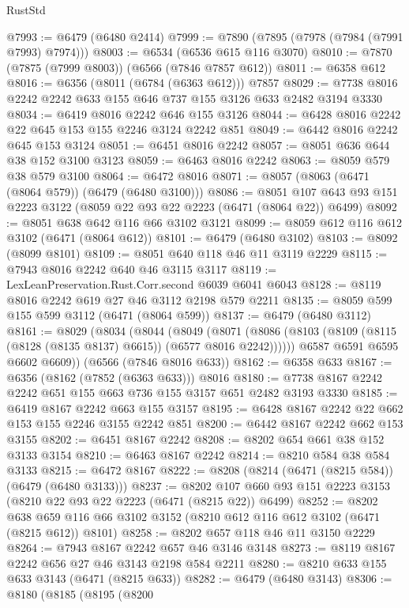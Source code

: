 \begin{lexlean}{RustStd}
\begin{coremodule}
@7993 := @6479 (@6480 @2414)
@7999 := @7890 (@7895 (@7978 (@7984 (@7991 @7993) @7974)))
@8003 := @6534 (@6536 @615 @116 @3070)
@8010 := @7870 (@7875 (@7999 @8003)) (@6566 (@7846 @7857 @612))
@8011 := @6358 @612
@8016 := @6356 (@8011 (@6784 (@6363 @612))) @7857
@8029 := @7738 @8016 @2242 @2242 @633 @155 @646 @737 @155 @3126 @633 @2482 @3194 @3330
@8034 := @6419 @8016 @2242 @646 @155 @3126
@8044 := @6428 @8016 @2242 @22 @645 @153 @155 @2246 @3124 @2242 @851
@8049 := @6442 @8016 @2242 @645 @153 @3124
@8051 := @6451 @8016 @2242
@8057 := @8051 @636 @644 @38 @152 @3100 @3123
@8059 := @6463 @8016 @2242
@8063 := @8059 @579 @38 @579 @3100
@8064 := @6472 @8016
@8071 := @8057 (@8063 (@6471 (@8064 @579)) (@6479 (@6480 @3100)))
@8086 := @8051 @107 @643 @93 @151 @2223 @3122 (@8059 @22 @93 @22 @2223 (@6471 (@8064 @22)) @6499)
@8092 := @8051 @638 @642 @116 @66 @3102 @3121
@8099 := @8059 @612 @116 @612 @3102 (@6471 (@8064 @612))
@8101 := @6479 (@6480 @3102)
@8103 := @8092 (@8099 @8101)
@8109 := @8051 @640 @118 @46 @11 @3119 @2229
@8115 := @7943 @8016 @2242 @640 @46 @3115 @3117
@8119 := LexLeanPreservation.Rust.Corr.second @6039 @6041 @6043
@8128 := @8119 @8016 @2242 @619 @27 @46 @3112 @2198 @579 @2211
@8135 := @8059 @599 @155 @599 @3112 (@6471 (@8064 @599))
@8137 := @6479 (@6480 @3112)
@8161 := @8029
    (@8034
      (@8044
        (@8049
          (@8071 (@8086 (@8103 (@8109 (@8115 (@8128 (@8135 @8137) @6615)) (@6577 @8016 @2242))))))
        @6587
        @6591
        @6595
        @6602
        @6609))
    (@6566 (@7846 @8016 @633))
@8162 := @6358 @633
@8167 := @6356 (@8162 (@7852 (@6363 @633))) @8016
@8180 := @7738 @8167 @2242 @2242 @651 @155 @663 @736 @155 @3157 @651 @2482 @3193 @3330
@8185 := @6419 @8167 @2242 @663 @155 @3157
@8195 := @6428 @8167 @2242 @22 @662 @153 @155 @2246 @3155 @2242 @851
@8200 := @6442 @8167 @2242 @662 @153 @3155
@8202 := @6451 @8167 @2242
@8208 := @8202 @654 @661 @38 @152 @3133 @3154
@8210 := @6463 @8167 @2242
@8214 := @8210 @584 @38 @584 @3133
@8215 := @6472 @8167
@8222 := @8208 (@8214 (@6471 (@8215 @584)) (@6479 (@6480 @3133)))
@8237 := @8202 @107 @660 @93 @151 @2223 @3153 (@8210 @22 @93 @22 @2223 (@6471 (@8215 @22)) @6499)
@8252 := @8202
    @638
    @659
    @116
    @66
    @3102
    @3152
    (@8210 @612 @116 @612 @3102 (@6471 (@8215 @612)) @8101)
@8258 := @8202 @657 @118 @46 @11 @3150 @2229
@8264 := @7943 @8167 @2242 @657 @46 @3146 @3148
@8273 := @8119 @8167 @2242 @656 @27 @46 @3143 @2198 @584 @2211
@8280 := @8210 @633 @155 @633 @3143 (@6471 (@8215 @633))
@8282 := @6479 (@6480 @3143)
@8306 := @8180
    (@8185
      (@8195
        (@8200

\end{coremodule}
\end{lexlean}
